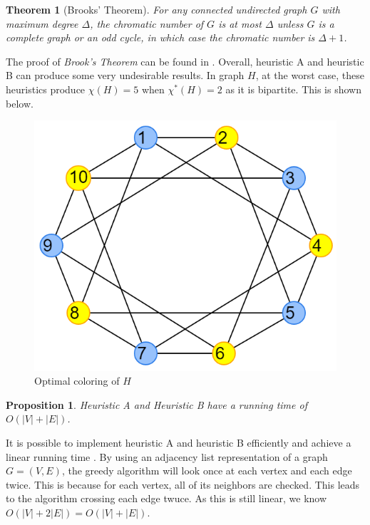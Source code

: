 \documentclass{article}
\newtheorem{prop}{Proposition}
\newtheorem*{theorem}{Theorem}
\theoremstyle{definition}
\begin{document}
\begin{theorem}[Brooks' Theorem]
For any connected undirected graph \(G\) with maximum degree \(\Delta\), the chromatic number of \(G\) is at most \(\Delta\) unless \(G\) is a complete graph or an odd cycle, in which case the chromatic number is \(\Delta + 1\).
\end{theorem}

The proof of \emph{Brook's Theorem} can be found in \cite{lovasz}. Overall, heuristic A and heuristic B can produce some very undesirable results. In graph \(H\), at the worst case, these heuristics produce \(\chi(H) = 5\) when \(\chi^{*}(H) = 2\) as it is bipartite. This is shown below.

\begin{figure}[H]
\centering
\includegraphics[scale=0.38]{images/graph-6.png}
\caption{Optimal coloring of \(H\)}
\end{figure}

\newpage

\begin{prop}
Heuristic A and Heuristic B have a running time of $O(|V| + |E|)$.
\end{prop}

It is possible to implement heuristic A and heuristic B efficiently and achieve a linear running time \cite{kubale}. By using an adjacency list representation of a graph \(G = (V, E)\), the greedy algorithm will look once at each vertex and each edge twice. This is because for each vertex, all of its neighbors are checked. This leads to the algorithm crossing each edge twuce. As this is still linear, we know \(O(|V| + 2|E|) = O(|V| + |E|)\).
\end{document}
